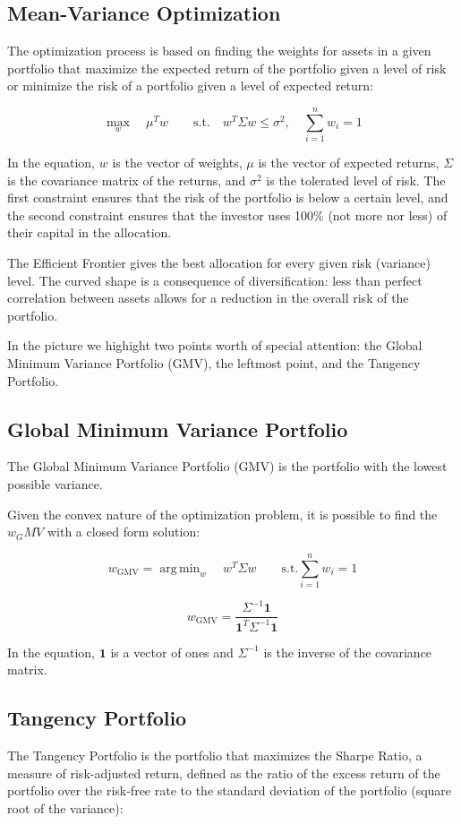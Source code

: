 \documentclass{article}
\DeclareMathOperator*{\argmin}{arg\,min}
\begin{document}
\subsection{Mean-Variance Optimization}
The optimization process is based on finding the weights for assets in a given portfolio that maximize the expected return of the portfolio given a level of risk or minimize the risk of a portfolio given a level of expected return:

$$
\max_{w} \quad \mu^{T} w \quad \quad
\text{s.t.} \quad w^{T} \Sigma w \leq \sigma^{2}, \quad
\sum_{i=1}^{n} w_{i} = 1
$$

In the equation, $w$ is the vector of weights, $\mu$ is the vector of expected returns, $\Sigma$ is the covariance matrix of the returns, and $\sigma^{2}$ is the tolerated level of risk. The first constraint ensures that the risk of the portfolio is below a certain level, and the second constraint ensures that the investor uses 100\% (not more nor less) of their capital in the allocation.

The Efficient Frontier gives the best allocation for every given risk (variance) level. The curved shape is a consequence of diversification: less than perfect correlation between assets allows for a reduction in the overall risk of the portfolio.

In the picture we highight two points worth of special attention: the Global Minimum Variance Portfolio (GMV), the leftmost point, and the Tangency Portfolio.

\subsection{Global Minimum Variance Portfolio}
The Global Minimum Variance Portfolio (GMV) is the portfolio with the lowest possible variance.

Given the convex nature of the optimization problem, it is possible to find the $w_GMV$ with a closed form solution:

$$
{w}_{\text{GMV}} = \argmin_{w} \quad w^{T} \Sigma w \quad \quad
\text{s.t.} \sum_{i=1}^{n} w_{i} = 1
$$

$$
{w}_{\text{GMV}} = \frac{\Sigma^{-1} \mathbf{1}}{\mathbf{1}^{T} \Sigma^{-1} \mathbf{1}}
$$

In the equation, $\mathbf{1}$ is a vector of ones and $\Sigma^{-1}$ is the inverse of the covariance matrix.

\subsection{Tangency Portfolio}
The Tangency Portfolio is the portfolio that maximizes the Sharpe Ratio, a measure of risk-adjusted return, defined as the ratio of the excess return of the portfolio over the risk-free rate to the standard deviation of the portfolio (square root of the variance):
\end{document}
